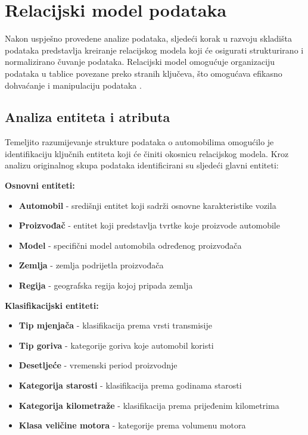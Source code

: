 \section{Relacijski model podataka}

Nakon uspješno provedene analize podataka, sljedeći korak u razvoju skladišta podataka predstavlja kreiranje relacijskog modela koji će osigurati strukturirano i normalizirano čuvanje podataka. Relacijski model omogućuje organizaciju podataka u tablice povezane preko stranih ključeva, što omogućava efikasno dohvaćanje i manipulaciju podataka \cite{Elmasri2017}.

\subsection{Analiza entiteta i atributa}

Temeljito razumijevanje strukture podataka o automobilima omogućilo je identifikaciju ključnih entiteta koji će činiti okosnicu relacijskog modela. Kroz analizu originalnog skupa podataka identificirani su sljedeći glavni entiteti:

\textbf{Osnovni entiteti:}
\begin{itemize}
    \item \textbf{Automobil} - središnji entitet koji sadrži osnovne karakteristike vozila
    \item \textbf{Proizvođač} - entitet koji predstavlja tvrtke koje proizvode automobile
    \item \textbf{Model} - specifični model automobila određenog proizvođača
    \item \textbf{Zemlja} - zemlja podrijetla proizvođača
    \item \textbf{Regija} - geografska regija kojoj pripada zemlja
\end{itemize}

\textbf{Klasifikacijski entiteti:}
\begin{itemize}
    \item \textbf{Tip mjenjača} - klasifikacija prema vrsti transmisije
    \item \textbf{Tip goriva} - kategorije goriva koje automobil koristi
    \item \textbf{Desetljeće} - vremenski period proizvodnje
    \item \textbf{Kategorija starosti} - klasifikacija prema godinama starosti
    \item \textbf{Kategorija kilometraže} - klasifikacija prema prijeđenim kilometrima
    \item \textbf{Klasa veličine motora} - kategorije prema volumenu motora
\end{itemize}

